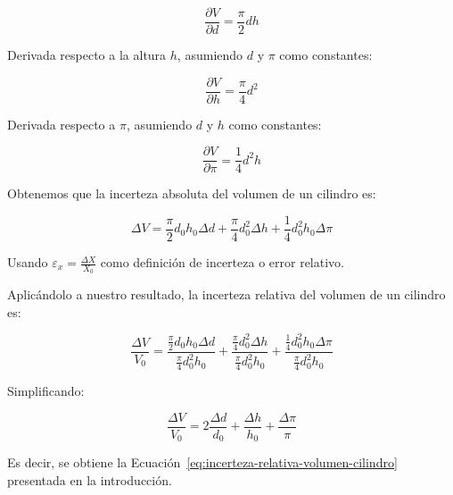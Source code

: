 \begin{equation}
    \frac{\partial V}{\partial d} = \frac{\pi}{2} d h
    \label{eq:derivada-diametro}
\end{equation}

Derivada respecto a la altura $h$, asumiendo $d$ y $\pi$ como constantes:

\begin{equation}
    \frac{\partial V}{\partial h} = \frac{\pi}{4} d^2
    \label{eq:derivada-altura}
\end{equation}

Derivada respecto a $\pi$, asumiendo $d$ y $h$ como constantes:

\begin{equation}
    \frac{\partial V}{\partial \pi} = \frac{1}{4} d^2 h
    \label{eq:derivada-pi}
\end{equation}

Obtenemos que la incerteza absoluta del volumen de un cilindro es:

\begin{equation}
    \Delta V = \frac{\pi}{2} d_0 h_0 \Delta d + \frac{\pi}{4} d_0^2 \Delta h + \frac{1}{4} d_0^2 h_0 \Delta \pi
    \label{eq:incerteza-final-volumen}
\end{equation}

Usando $\varepsilon_x = \frac{\Delta X}{X_0}$ como definición de incerteza o error relativo.

Aplicándolo a nuestro resultado, la incerteza relativa del volumen de un cilindro es:

\begin{equation}
    \frac{\Delta V}{V_0} = \frac{\frac{\pi}{2} d_0 h_0 \Delta d}{\frac{\pi}{4} d_0^2 h_0} + \frac{\frac{\pi}{4} d_0^2 \Delta h}{\frac{\pi}{4} d_0^2 h_0} + \frac{\frac{1}{4} d_0^2 h_0 \Delta \pi}{\frac{\pi}{4} d_0^2 h_0}
    \label{eq:incerteza-relativa-desarrollo-volumen}
\end{equation}

Simplificando:

\begin{equation}
    \frac{\Delta V}{V_0} = 2\frac{\Delta d}{d_0} + \frac{\Delta h}{h_0} + \frac{\Delta \pi}{\pi}
    \label{eq:incerteza-relativa-simplificada-volumen}
\end{equation}

Es decir, se obtiene la Ecuación~\eqref{eq:incerteza-relativa-volumen-cilindro} presentada en la introducción.


